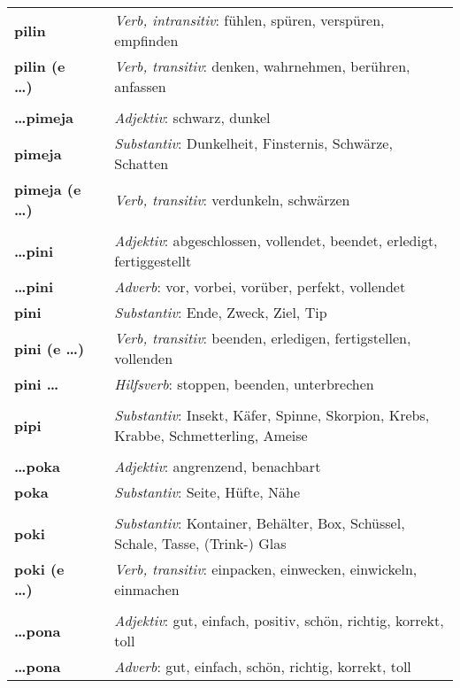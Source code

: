 \begin{supertabular}{p{2,5cm}|ll}
\textbf{pilin} && \textit{Verb, intransitiv}: fühlen, spüren, verspüren, empfinden \\ 
\textbf{pilin (e \dots)} && \textit{Verb, transitiv}: denken, wahrnehmen, berühren, anfassen \\ 
 && \\ %
\textbf{\dots pimeja} && \textit{Adjektiv}: schwarz, dunkel \\ 
\textbf{pimeja} && \textit{Substantiv}: Dunkelheit, Finsternis, Schwärze, Schatten \\ 
\textbf{pimeja (e \dots)} && \textit{Verb, transitiv}: verdunkeln, schwärzen \\ 
 && \\ %
\textbf{\dots pini} && \textit{Adjektiv}: abgeschlossen, vollendet, beendet, erledigt, fertiggestellt  \\ 
\textbf{\dots pini} && \textit{Adverb}: vor, vorbei, vorüber, perfekt, vollendet \\ 
\textbf{pini} && \textit{Substantiv}: Ende, Zweck, Ziel, Tip \\ 
\textbf{pini (e \dots)} && \textit{Verb, transitiv}: beenden, erledigen, fertigstellen, vollenden  \\ 
\textbf{pini \dots } && \textit{Hilfsverb}: stoppen, beenden, unterbrechen \\ 
 && \\ %
\textbf{pipi} && \textit{Substantiv}: Insekt, Käfer, Spinne, Skorpion, Krebs, Krabbe, Schmetterling, Ameise \\ 
 && \\ %
\textbf{\dots poka} && \textit{Adjektiv}: angrenzend, benachbart \\ 
\textbf{poka} && \textit{Substantiv}: Seite, Hüfte, Nähe \\ 
 && \\ %
\textbf{poki} && \textit{Substantiv}: Kontainer, Behälter, Box, Schüssel, Schale, Tasse, (Trink-) Glas \\ 
\textbf{poki (e \dots)} && \textit{Verb, transitiv}: einpacken, einwecken, einwickeln, einmachen  \\ 
 && \\ %
\textbf{\dots pona} && \textit{Adjektiv}: gut, einfach, positiv, schön, richtig, korrekt, toll \\ 
\textbf{\dots pona} && \textit{Adverb}: gut, einfach, schön, richtig, korrekt, toll \\ 

\end{supertabular}
